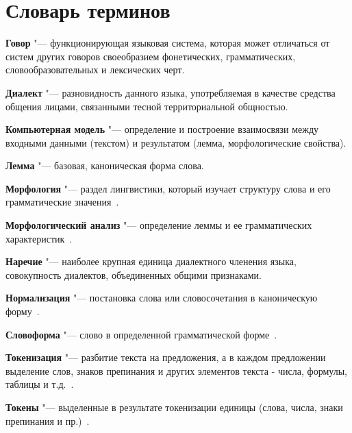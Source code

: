\chapter*{Словарь терминов}             %

\textbf{Говор} "--- функционирующая языковая система, которая может отличаться от систем других говоров своеобразием фонетических, грамматических, словообразовательных и лексических черт.~
\cite{Novak2019Grammar}

\textbf{Диалект} "--- разновидность данного языка, употребляемая в качестве средства общения лицами, связанными тесной территориальной общностью.~
\cite{Novak2019Grammar}

\textbf{Компьютерная модель} "--- определение и построение взаимосвязи между входными данными (текстом) и результатом (лемма, морфологические свойства).

\textbf{Лемма} "--- базовая, каноническая форма слова.

\textbf{Морфология} "--- раздел лингвистики, который изучает структуру слова и его грамматические значения~\cite{MitreninaNikolaevLando2016}.

\textbf{Морфологический анализ} "--- определение леммы и ее грамматических характеристик~\cite{MitreninaNikolaevLando2016}.

\textbf{Наречие} "--- наиболее крупная единица диалектного членения языка, совокупность диалектов, объединенных общими признаками.~
\cite{Novak2019Grammar}

\textbf{Нормализация} "--- постановка слова или словосочетания в каноническую форму~\cite{MitreninaNikolaevLando2016}.

\textbf{Словоформа} "--- слово в определенной грамматической форме~\cite{MitreninaNikolaevLando2016}.

\textbf{Токенизация} "--- разбитие текста на предложения, а в каждом предложении выделение слов, знаков препинания и других элементов текста - числа, формулы, таблицы и т.д.~\cite{MitreninaNikolaevLando2016}.

\textbf{Токены} "--- выделенные в результате токенизации единицы (слова, числа, знаки препинания и пр.)~\cite{MitreninaNikolaevLando2016}.
